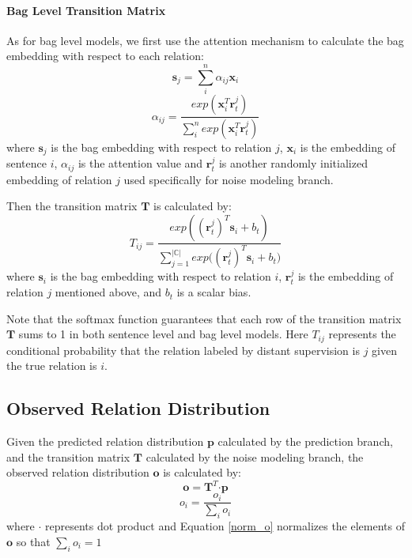 \paragraph{Bag Level Transition Matrix}
As for bag level models, we first use the attention mechanism to calculate the bag embedding with respect to each relation:
\begin{equation}
\mathbf{s}_{j} = \sum_i^{n}{\alpha_{ij} \mathbf{x}_{i}}
\end{equation}
\begin{equation}
\alpha_{ij} = \frac{exp(\mathbf{x}_i^T \mathbf{r}_t^j)}{\sum_i^n{exp(\mathbf{x}_i^T \mathbf{r}_t^j)}}
\end{equation}
where $\mathbf{s}_j$ is the bag embedding with respect to relation $j$, $\mathbf{x}_i$ is the embedding of sentence $i$, $\alpha_{ij}$ is the attention value and $\mathbf{r}_t^j$ is another randomly initialized embedding of relation $j$ used specifically for noise modeling branch.

Then the transition matrix $\mathbf{T}$ is calculated by:
\begin{equation}
T_{ij} = \frac{exp({(\mathbf{r}_t^j)^T \mathbf{s}_i + b_t})}{\sum_{j=1}^{|\mathbb{C}|}{exp((\mathbf{r}_t^j)^T \mathbf{s}_i + b_t})}
\end{equation}
where $\mathbf{s}_i$ is the bag embedding with respect to relation $i$, $\mathbf{r}_t^j$ is the embedding of relation $j$ mentioned above, and $b_t$ is a scalar bias.

Note that the softmax function guarantees that each row of the transition matrix $\mathbf{T}$ sums to 1 in both sentence level and bag level models. Here $T_{ij}$ represents the conditional probability that the relation labeled by distant supervision is $j$ given the true relation is $i$.


\subsection{Observed Relation Distribution}
Given the predicted relation distribution $\mathbf{p}$ calculated by the prediction branch, and the transition matrix $\mathbf{T}$ calculated by the noise modeling branch, the observed relation distribution $\mathbf{o}$ is calculated by:
 \begin{equation}
\mathbf{o} = \mathbf{T}^T \bm\cdot \mathbf{p}
 \end{equation}
 \begin{equation}
 \label{norm_o}
 o_i = \frac{o_i}{\sum_i{o_i}}
 \end{equation}
 where $\bm\cdot$ represents dot product and Equation \ref{norm_o} normalizes the elements of $\mathbf{o}$ so that $\sum_i{o_i}=1$

